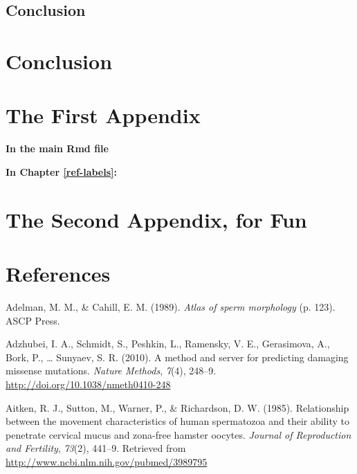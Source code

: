 \documentclass[12pt,twoside]{reedthesis}
\theoremstyle{definition}
\theoremstyle{definition}
\theoremstyle{remark}
\begin{document}
  \section{Conclusion}\label{conclusion-1}
  
  \chapter*{Conclusion}\label{conclusion-2}
  
  \appendix
  
  \chapter{The First Appendix}\label{the-first-appendix}
  
  \textbf{In the main Rmd file}
  
  \textbf{In Chapter \ref{ref-labels}:}
  
  \chapter{The Second Appendix, for
  Fun}\label{the-second-appendix-for-fun}
  
  \backmatter
  
  \chapter*{References}\label{references}
  
  \noindent
  
  \setlength{\parindent}{-0.20in} \setlength{\leftskip}{0.20in}
  \setlength{\parskip}{8pt}
  
  \hypertarget{refs}{}
  \hypertarget{ref-Adelman1989}{}
  Adelman, M. M., \& Cahill, E. M. (1989). \emph{Atlas of sperm
  morphology} (p. 123). ASCP Press.
  
  \hypertarget{ref-Adzhubei2010}{}
  Adzhubei, I. A., Schmidt, S., Peshkin, L., Ramensky, V. E., Gerasimova,
  A., Bork, P., \ldots{} Sunyaev, S. R. (2010). A method and server for
  predicting damaging missense mutations. \emph{Nature Methods},
  \emph{7}(4), 248--9. \url{http://doi.org/10.1038/nmeth0410-248}
  
  \hypertarget{ref-Aitken1985}{}
  Aitken, R. J., Sutton, M., Warner, P., \& Richardson, D. W. (1985).
  Relationship between the movement characteristics of human spermatozoa
  and their ability to penetrate cervical mucus and zona-free hamster
  oocytes. \emph{Journal of Reproduction and Fertility}, \emph{73}(2),
  441--9. Retrieved from \url{http://www.ncbi.nlm.nih.gov/pubmed/3989795}
  
\end{document}
